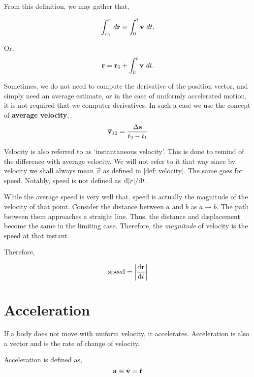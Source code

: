 From this definition, we may gather that,

\[\int_{r_0}^{r} \mathop{}{d}{\boldsymbol{\mathbf{r}}} = \int_{0}^{t} \boldsymbol{\mathbf{v}} \mathop{}{d}{t},\]

Or, 
\begin{equation}
    \boldsymbol{\mathbf{r}} = \boldsymbol{\mathbf{r}}_0 + \int_{0}^{t} \boldsymbol{\mathbf{v}} \mathop{}{d}{t}.
\end{equation}

Sometimes, we do not need to compute the derivative of the position vector, and simply need an average
estimate, or in the case of uniformly accelerated motion, it is not required that we computer derivatives.
In such a case we use the concept of \textbf{average velocity}, \[
    \overline{\boldsymbol{\mathbf{v}}}_{12} = \frac{\Delta\boldsymbol{\mathbf{s}}}{t_2 - t_1}  
\]


Velocity is also referred to as `instantaneous velocity'. This is done to remind of the difference
with average velocity. We will not refer to it that way since by velocity we shall always mean \(\vec{v}\) as defined in
\cref{def: velocity}. The same goes for speed. Notably, speed is not defined as \(\dv*{\abs{r}}{t}\).

While the average speed is very well that, speed is actually the magnitude of the velocity of that point. 
Consider the distance between \(a\) and \(b\) as 
\(a \to b\). The path between them approaches a straight line. Thus, the distance and displacement become the same
in the limiting case. Therefore, the \emph{magnitude} of velocity is the speed at that instant.

Therefore, 

\[\text{speed} = \abs{\dv{\boldsymbol{\mathbf{r}}}{t}}\]

\section{Acceleration}

If a body does not move with uniform velocity, it accelerates. Acceleration is also a vector and
is the rate of change of velocity.


\begin{definition}
    [Acceleration]
    \label{def: acceleration}
    Acceleration is defined as,
    \begin{equation}
        \boldsymbol{\mathbf{a}} \equiv \dot{\boldsymbol{\mathbf{v}}} = \ddot{\boldsymbol{\mathbf{r}}}    
    \end{equation}
\end{definition}

